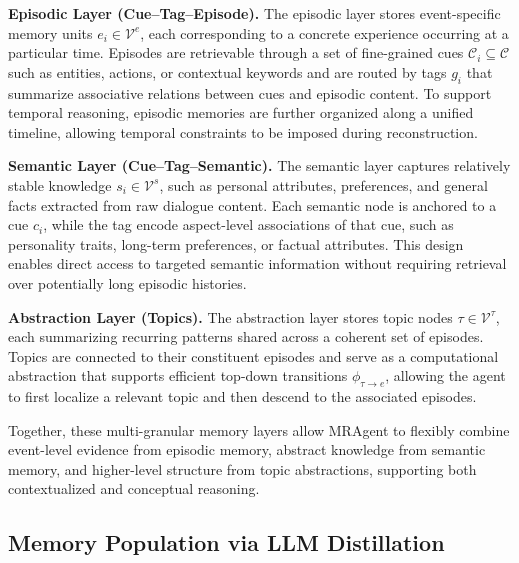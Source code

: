 \textbf{Episodic Layer (Cue--Tag--Episode).}
The episodic layer stores event-specific memory units $e_i \in \mathcal{V}^e$, each corresponding to a concrete experience occurring at a particular time. Episodes are retrievable through a set of fine-grained cues $\mathcal{C}_i \subseteq \mathcal{C}$
such as entities, actions, or contextual keywords and are routed by tags $g_i$ that summarize associative relations between cues and episodic content.
To support temporal reasoning, episodic memories are further organized along a unified timeline,
allowing temporal constraints to be imposed during reconstruction.

\textbf{Semantic Layer (Cue--Tag--Semantic).}
The semantic layer captures relatively stable knowledge $s_i \in \mathcal{V}^s$, such as personal attributes, preferences, and general facts extracted from raw dialogue content.
Each semantic node is anchored to a cue $c_i$, while the tag encode aspect-level associations of that cue, such as personality traits, long-term preferences, or factual attributes. This design enables direct access to targeted semantic information without requiring retrieval over potentially long episodic histories.

\textbf{Abstraction Layer (Topics).}
The abstraction layer stores topic nodes $\tau \in \mathcal{V}^\tau$, each
summarizing recurring patterns shared across a coherent set of episodes. Topics
are connected to their constituent episodes and serve as a computational
abstraction that supports efficient top-down transitions $\phi_{\tau \to e}$,
allowing the agent to first localize a relevant topic and then descend to the
associated episodes.

Together, these multi-granular memory layers allow MRAgent to flexibly combine
event-level evidence from episodic memory, abstract knowledge from semantic
memory, and higher-level structure from topic abstractions, supporting both
contextualized and conceptual reasoning.

\subsection{Memory Population via LLM Distillation}

